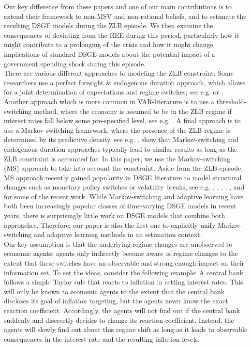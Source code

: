 \documentclass[12pt,reqno]{article}
\numberwithin{equation}{section}
\begin{document}
Our key difference from these papers and one of our main contributions is to extend their framework to non-MSV and non-rational beliefs, and to estimate the resulting DSGE models during the ZLB episode. We then examine the consequences of deviating from the REE during this period, particularly how it might contribute to a prolonging of the crisis and how it might change implications of standard DSGE models about the potential impact of a government spending shock during this episode. \\

\noindent
There are various different approaches to modeling the ZLB constraint: Some researchers use a perfect foresight \&  endogenous duration approach, which allows for a joint determination of expectations and regime switches; see e.g. \cite{maih2015efficient} or \cite{linde2017estimation}. Another approach which is more common in VAR-literature is to use a threshold-switching method, where the economy is assumed to be in the ZLB regime if interest rates fall below some pre-specified level, see e.g. \cite{bonam2017effects}. A final approach is to use a Markov-switching framework, where the presence of the ZLB regime is determined by its predictive density, see e.g. \cite{binning2016implementing}. \cite{linde2017estimation} show that Markov-switching and endogenous duration approaches typically lead to similar results as long as the ZLB constraint is accounted for. In this paper, we use the Markov-switching (MS) approach to take into account the constraint. Aside from the ZLB episode, MS approach recently gained popularity in DSGE literature to model structural changes such as monetary policy switches or volatility breaks, see e.g. \cite{sims2006were}, \cite{davig2007generalizing}, \cite{sims2008methods}, \cite{liu2011sources}, \cite{liu2011evolving}, \cite{bianchi2016methods} and \cite{bianchi2017monetary} for some of the recent work. While Markov-switching and adaptive learning have both been increasingly popular classes of time-varying DSGE models in recent years, there is surprisingly little work on DSGE models that combine both approaches. Therefore, our paper is also the first one to explicitly unify Markov-switching and adaptive learning methods in an estimation context. \\

\noindent
Our key assumption is that  the underlying regime changes are unobserved to economic agents: agents only indirectly become aware of regime changes to the extent that these switches have an observable and strong enough impact on their information set. To set the ideas, consider the following example: A central bank follows a simple Taylor rule that reacts to inflation in setting interest rates. This will only be known to economic agents to the extent that the central bank discloses its goal of inflation targeting, but the agents never know the exact reaction coefficient. Accordingly, the agents will not find out if the central bank suddenly and discreetly decides to change its reaction coefficient. Instead, the agents will slowly find out about this regime shift as long as it  leads to observable consequences in the interest rate and the resulting inflation levels. \\
\end{document}
